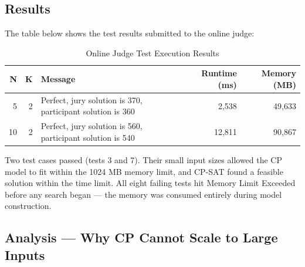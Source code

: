 \documentclass[11pt]{article}
\begin{document}
\subsection{Results}
The table below shows the test results submitted to the online judge:

\begin{table}[h]
\centering
\caption{Online Judge Test Execution Results}
\begin{tabularx}{\textwidth}{r r X r r} 
\toprule
\textbf{N} & \textbf{K} & \textbf{Message} & \textbf{Runtime (ms)} & \textbf{Memory (MB)} \\
\midrule
5 & 2 & Perfect, jury solution is 370, participant solution is 360 & 2,538 & 49,633 \\
10 & 2 & Perfect, jury solution is 560, participant solution is 540 & 12,811 & 90,867 \\
\bottomrule
\end{tabularx}
\end{table}

Two test cases passed (tests 3 and 7). Their small input sizes allowed the CP model to fit within the 1024 MB memory limit, and CP-SAT found a feasible solution within the time limit. All eight failing tests hit Memory Limit Exceeded before any search began — the memory was consumed entirely during model construction.

\subsection{Analysis — Why CP Cannot Scale to Large Inputs}
\end{document}

